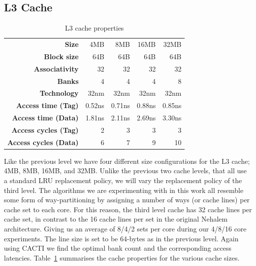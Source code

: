 \subsection{L3 Cache}
\begin{table}[ht]
\centering
\begin{tabular}{rrrrr}
\toprule
\bf{Size}                 & 4MB         & 8MB         & 16MB        & 32MB              \\
\bf{Block size}           & 64B         & 64B         & 64B         & 64B               \\
\bf{Associativity}        & 32          & 32          & 32          & 32                \\
\bf{Banks}                & 4           & 4           & 4           & 8                 \\
\bf{Technology}           & 32nm        & 32nm        & 32nm        & 32nm              \\
\bf{Access time (Tag)}    & 0.52ns      & 0.71ns      & 0.88ns      & 0.85ns            \\
\bf{Access time (Data)}   & 1.81ns      & 2.11ns      & 2.69ns      & 3.30ns            \\
\bf{Access cycles (Tag)}  & 2           & 3           & 3           & 3                 \\
\bf{Access cycles (Data)} & 6           & 7           & 9           & 10                \\
\bottomrule
\end{tabular}
\caption{L3 cache properties}
\label{tbl:processor_model:l3}
\end{table}

Like the previous level we have four different size configurations for the L3 cache; 4MB, 8MB, 16MB, and 32MB.
Unlike the previous two cache levels, that all use a standard LRU replacement policy, we will vary the replacement policy of the third level.
The algorithms we are experimenting with in this work all resemble some form of way-partitioning by assigning a number of ways (or cache lines) per cache set to each core.
For this reason, the third level cache has 32 cache lines per cache set, in contrast to the 16 cache lines per set in the original Nehalem architecture.
Giving us an average of 8/4/2 sets per core during our 4/8/16 core experiments.
The line size is set to be 64-bytes as in the previous level.
Again using CACTI we find the optimal bank count and the corresponding access latencies.
Table~\ref{tbl:processor_model:l3} summarises the cache properties for the various cache sizes.
